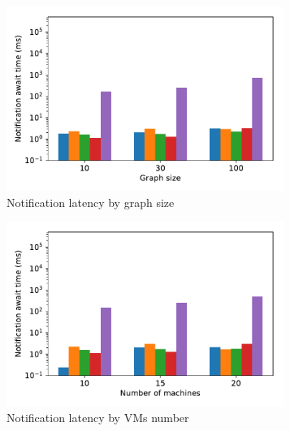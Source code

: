 \begin{figure}[t!]
    \begin{subfigure}[b]{0.32\textwidth}
            \includegraphics[width=0.99\textwidth]{pics/notification_await_time_by_graph_size_bars.pdf}
            \caption{Notification latency by graph size}
            \label{notification_graph}
    \end{subfigure}
    \hspace{5mm}
    \begin{subfigure}[b]{0.32\textwidth}
            \includegraphics[width=0.99\textwidth]{pics/notification_await_time_by_number_of_machines_bars.pdf}
            \caption{Notification latency by VMs number}
            \label{notification_machines}
    \end{subfigure}
    \hspace{5mm}
    \begin{subfigure}[b]{0.32\textwidth}

\end{subfigure}
\end{figure}

